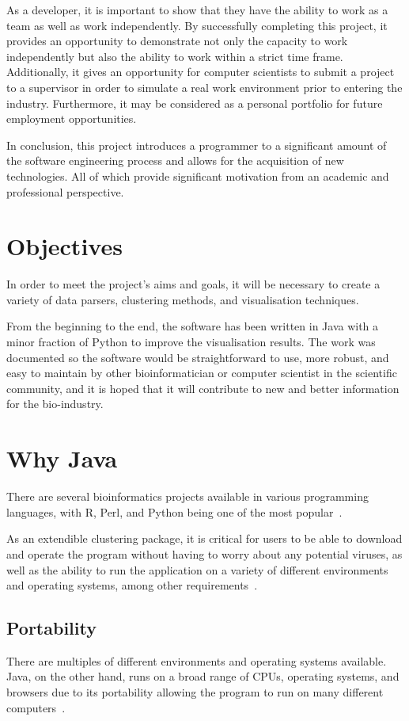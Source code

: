 \documentclass[]{final_report}
\begin{document}
As a developer, it is important to show that they have the ability to work as a team as well as work independently. By successfully completing this project, it provides an opportunity to demonstrate not only the capacity to work independently but also the ability to work within a strict time frame. Additionally, it gives an opportunity for computer scientists to submit a project to a supervisor in order to simulate a real work environment prior to entering the industry. Furthermore, it may be considered as a personal portfolio for future employment opportunities.

In conclusion, this project introduces a programmer to a significant amount of the software engineering process and allows for the acquisition of new technologies. All of which provide significant motivation from an academic and professional perspective.

\section{Objectives}

In order to meet the project's aims and goals, it will be necessary to create a variety of data parsers, clustering methods, and visualisation techniques.

From the beginning to the end, the software has been written in Java with a minor fraction of Python to improve the visualisation results. The work was documented so the software would be straightforward to use, more robust, and easy to maintain by other bioinformatician or computer scientist in the scientific community, and it is hoped that it will contribute to new and better information for the bio-industry.

\section{Why Java}
There are several bioinformatics projects available in various programming languages, with R, Perl, and Python being one of the most popular~\cite{gewehr2007bioweka}.

As an extendible clustering package, it is critical for users to be able to download and operate the program without having to worry about any potential viruses, as well as the ability to run the application on a variety of different environments and operating systems, among other requirements~\cite{schildt2019java}.

\subsection{Portability}
There are multiples of different environments and operating systems available. Java, on the other hand, runs on a broad range of CPUs, operating systems, and browsers due to its portability allowing the program to run on many different computers~\cite{schildt2019java}.
\end{document}
